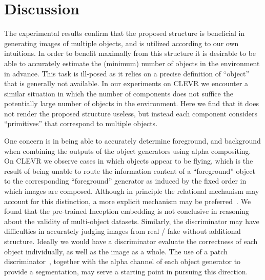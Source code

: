\documentclass{article}
\begin{document}
\section{Discussion}
\vspace{-0.2cm}%
The experimental results confirm that the proposed structure is beneficial in generating images of multiple objects, and is utilized according to our own intuitions.
In order to benefit maximally from this structure it is desirable to be able to accurately estimate the (minimum) number of objects in the environment in advance.
This task is ill-posed as it relies on a precise definition of ``object'' that is generally not available.
In our experiments on CLEVR we encounter a similar situation in which the number of components does not suffice the potentially large number of objects in the environment.
Here we find that it does not render the proposed structure useless, but instead each component considers ``primitives'' that correspond to multiple objects.

One concern is in being able to accurately determine foreground, and background when combining the outputs of the object generators using alpha compositing.
On CLEVR we observe cases in which objects appear to be flying, which is the result of being unable to route the information content of a ``foreground'' object to the corresponding ``foreground'' generator as induced by the fixed order in which images are composed.
Although in principle the relational mechanism may account for this distinction, a more explicit mechanism may be preferred~\citep{mena2018learning}.
We found that the pre-trained Inception embedding is not conclusive in reasoning about the validity of multi-object datasets.
Similarly, the discriminator may have difficulties in accurately judging images from real / fake without additional structure.
Ideally we would have a discriminator evaluate the correctness of each object individually, as well as the image as a whole.
The use of a patch discriminator~\citep{isola2017image}, together with the alpha channel of each object generator to provide a segmentation, may serve a starting point in pursuing this direction.
\end{document}
